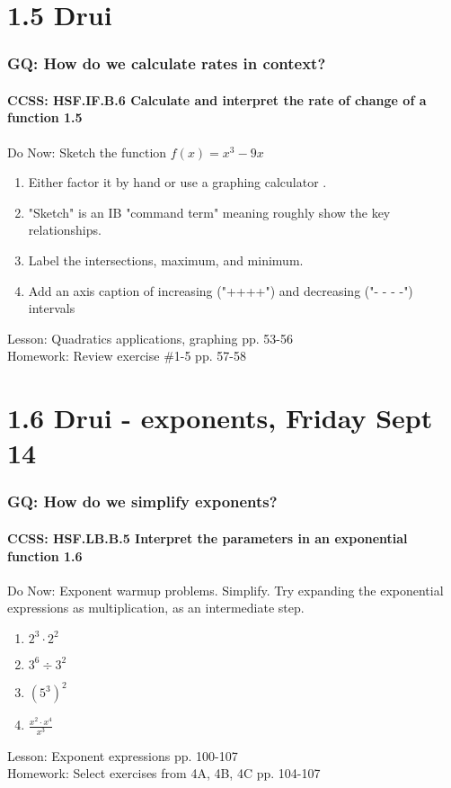 \documentclass{beamer}
\begin{document}
\section{1.5 Drui}
  \frame
  {
    \frametitle{GQ: How do we calculate rates in context?}
    \framesubtitle{CCSS: HSF.IF.B.6 Calculate and interpret the rate of change of a function   \alert{1.5}}

    \begin{block}{Do Now: Sketch the function $f(x)=x^3-9x$}
      \begin{enumerate}
      \item Either factor it by hand or use a graphing calculator .
      \item "Sketch" is an IB "command term" meaning roughly show the key relationships.
      \item Label the intersections, maximum, and minimum.
      \item Add an axis caption of increasing ("++++") and decreasing ("- - - -") intervals
      \end{enumerate}
   \end{block}
    Lesson: Quadratics applications, graphing pp. 53-56\\ \bigskip
    Homework: Review exercise \#1-5 pp. 57-58
  }

\section{1.6 Drui - exponents, Friday Sept 14}
  \frame
  {
    \frametitle{GQ: How do we simplify exponents?}
    \framesubtitle{CCSS: HSF.LB.B.5 Interpret the parameters in an exponential function  \alert{1.6}}

    \begin{block}{Do Now: Exponent warmup problems. Simplify. Try expanding the exponential expressions as multiplication, as an intermediate step.}
      \begin{enumerate}
      \item $2^3 \cdot 2^2$
      \item $3^6 \div 3^2$
      \item $(5^3)^2$
      \item $\displaystyle \frac{x^2 \cdot x^4}{x^3}$
      \end{enumerate}
   \end{block}
    Lesson: Exponent expressions pp. 100-107\\ \bigskip
    Homework: Select exercises from  4A, 4B, 4C pp. 104-107
  }
\end{document}
